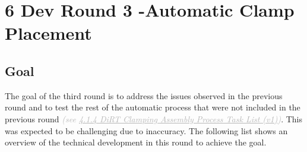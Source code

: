 
\chapter{6 Dev Round 3 -Automatic Clamp Placement}

\section{Goal}

The goal of the third round is to address the issues observed in the previous round and to test the rest of the automatic process that were not included in the previous round \textit{\textcolor[HTML]{B7B7B7}{(see \uline{4.1.4 DiRT Clamping Assembly Process Task List (v1)})}}. This was expected to be challenging due to inaccuracy. The following list shows an overview of the technical development in this round to achieve the goal. 

